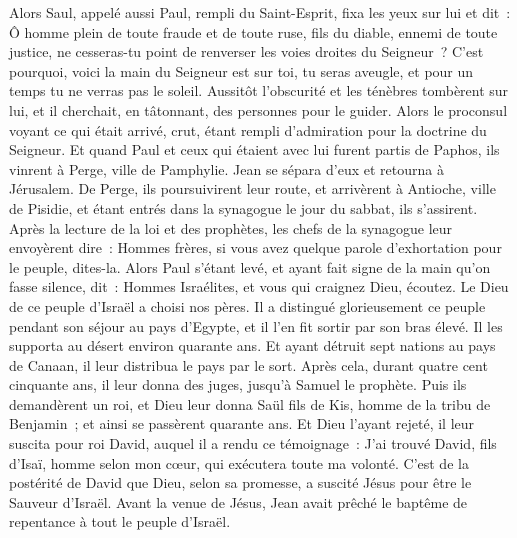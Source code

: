 \begin{multicols}{2}
Alors Saul, appelé aussi Paul, rempli du Saint-Esprit, fixa les yeux sur lui et dit~:
Ô homme plein de toute fraude et de toute ruse, fils du diable, ennemi de toute justice, ne cesseras-tu point de renverser les voies droites du Seigneur~?
C'est pourquoi, voici la main du Seigneur est sur toi, tu seras aveugle, et pour un temps tu ne verras pas le soleil. Aussitôt l'obscurité et les ténèbres tombèrent sur lui, et il cherchait, en tâtonnant, des personnes pour le guider.
Alors le proconsul voyant ce qui était arrivé, crut, étant rempli d'admiration pour la doctrine du Seigneur.
Et quand Paul et ceux qui étaient avec lui furent partis de Paphos, ils vinrent à Perge, ville de Pamphylie. Jean se sépara d'eux et retourna à Jérusalem.
De Perge, ils poursuivirent leur route, et arrivèrent à Antioche, ville de Pisidie, et étant entrés dans la synagogue le jour du sabbat, ils s'assirent.
Après la lecture de la loi et des prophètes, les chefs de la synagogue leur envoyèrent dire~: Hommes frères, si vous avez quelque parole d'exhortation pour le peuple, dites-la.
Alors Paul s'étant levé, et ayant fait signe de la main qu'on fasse silence, dit~: Hommes Israélites, et vous qui craignez Dieu, écoutez.
Le Dieu de ce peuple d'Israël a choisi nos pères. Il a distingué glorieusement ce peuple pendant son séjour au pays d'Egypte, et il l'en fit sortir par son bras élevé.
Il les supporta au désert environ quarante ans.
Et ayant détruit sept nations au pays de Canaan, il leur distribua le pays par le sort.
Après cela, durant quatre cent cinquante ans, il leur donna des juges, jusqu'à Samuel le prophète.
Puis ils demandèrent un roi, et Dieu leur donna Saül fils de Kis, homme de la tribu de Benjamin~; et ainsi se passèrent quarante ans.
Et Dieu l'ayant rejeté, il leur suscita pour roi David, auquel il a rendu ce témoignage~: J'ai trouvé David, fils d'Isaï, homme selon mon cœur, qui exécutera toute ma volonté.
C'est de la postérité de David que Dieu, selon sa promesse, a suscité Jésus pour être le Sauveur d'Israël.
Avant la venue de Jésus, Jean avait prêché le baptême de repentance à tout le peuple d'Israël.

\end{multicols}
